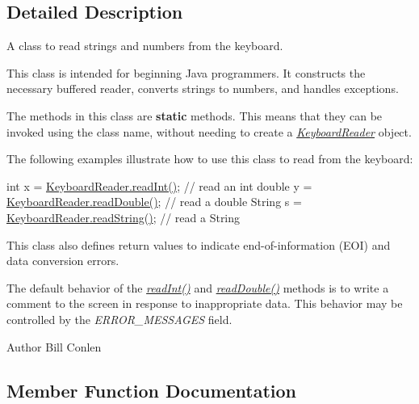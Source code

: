 \subsection{Detailed Description}
A class to read strings and numbers from the keyboard. 

This class is intended for beginning Java programmers. It constructs the necessary buffered reader, converts strings to numbers, and handles exceptions. 

The methods in this class are {\bfseries static} methods. This means that they can be invoked using the class name, without needing to create a {\itshape \hyperlink{classgraphCode_1_1KeyboardReader}{Keyboard\+Reader}} object. 

The following examples illustrate how to use this class to read from the keyboard\+: 
\begin{DoxyPre}
   int x = \hyperlink{classgraphCode_1_1KeyboardReader_add978b1e4a585c5d7ab75113af2c42fa}{KeyboardReader.readInt()};        // read an int
   double y = \hyperlink{classgraphCode_1_1KeyboardReader_ac9ff0d97d041350b957dce4822813ba0}{KeyboardReader.readDouble()};  // read a double
   String s = \hyperlink{classgraphCode_1_1KeyboardReader_a675b8013d5093b880c8988ca4e4dacd8}{KeyboardReader.readString()};    // read a String
\end{DoxyPre}
 This class also defines return values to indicate end-\/of-\/information (E\+OI) and data conversion errors. 

The default behavior of the {\itshape \hyperlink{classgraphCode_1_1KeyboardReader_add978b1e4a585c5d7ab75113af2c42fa}{read\+Int()}} and {\itshape \hyperlink{classgraphCode_1_1KeyboardReader_ac9ff0d97d041350b957dce4822813ba0}{read\+Double()}} methods is to write a comment to the screen in response to inappropriate data. This behavior may be controlled by the {\itshape E\+R\+R\+O\+R\+\_\+\+M\+E\+S\+S\+A\+G\+ES} field. 

\begin{DoxyAuthor}{Author}
Bill Conlen 
\end{DoxyAuthor}


\subsection{Member Function Documentation}
